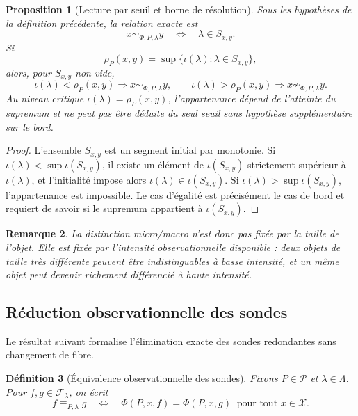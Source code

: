 \documentclass[11pt,a4paper,openany]{book}
\newtheorem{definition}{Définition}[chapter]
\newtheorem{proposition}[definition]{Proposition}
\newtheorem{remark}[definition]{Remarque}
\begin{document}
\begin{proposition}[Lecture par seuil et borne de résolution]
Sous les hypothèses de la définition précédente, la relation exacte est
\[
x\sim_{\Phi,P,\lambda}y
\quad\Longleftrightarrow\quad
\lambda\in S_{x,y}.
\]
Si
\[
\rho_P(x,y)=\sup\{\iota(\lambda):\lambda\in S_{x,y}\},
\]
alors, pour \(S_{x,y}\) non vide,
\[
\iota(\lambda)<\rho_P(x,y)\Longrightarrow x\sim_{\Phi,P,\lambda}y,
\qquad
\iota(\lambda)>\rho_P(x,y)\Longrightarrow x\not\sim_{\Phi,P,\lambda}y.
\]
Au niveau critique \(\iota(\lambda)=\rho_P(x,y)\), l'appartenance dépend de l'atteinte du supremum et ne peut pas être déduite du seul seuil sans hypothèse supplémentaire sur le bord.
\end{proposition}

\begin{proof}
L'ensemble \(S_{x,y}\) est un segment initial par monotonie. Si \(\iota(\lambda)<\sup\iota(S_{x,y})\), il existe un élément de \(\iota(S_{x,y})\) strictement supérieur à \(\iota(\lambda)\), et l'initialité impose alors \(\iota(\lambda)\in\iota(S_{x,y})\). Si \(\iota(\lambda)>\sup\iota(S_{x,y})\), l'appartenance est impossible. Le cas d'égalité est précisément le cas de bord et requiert de savoir si le supremum appartient à \(\iota(S_{x,y})\).
\end{proof}

\begin{remark}
La distinction micro/macro n'est donc pas fixée par la taille de l'objet. Elle est fixée par l'intensité observationnelle disponible : deux objets de taille très différente peuvent être indistinguables à basse intensité, et un même objet peut devenir richement différencié à haute intensité.
\end{remark}

\subsection{Réduction observationnelle des sondes}

Le résultat suivant formalise l'élimination exacte des sondes redondantes sans changement de fibre.

\begin{definition}[Équivalence observationnelle des sondes]
Fixons \(P\in\mathcal P\) et \(\lambda\in\Lambda\). Pour \(f,g\in\mathcal F_\lambda\), on écrit
\[
f\equiv_{P,\lambda} g
\quad\Longleftrightarrow\quad
\Phi(P,x,f)=\Phi(P,x,g)\ \text{ pour tout }x\in\mathcal X.
\]
\end{definition}
\end{document}
